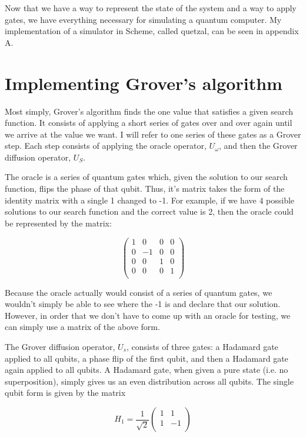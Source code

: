 \documentclass[11pt]{article}
\begin{document}
Now that we have a way to represent the state of the system and a way to apply gates, we have everything necessary for simulating a quantum computer. My implementation of a simulator in Scheme, called quetzal, can be seen in appendix A.

\section{Implementing Grover's algorithm}

Most simply, Grover's algorithm finds the one value that satisfies a given search function. It consists of applying a short series of gates over and over again until we arrive at the value we want. I will refer to one series of these gates as a Grover step. Each step consists of applying the oracle operator, $U_{\omega}$, and then the Grover diffusion operator, $U_{S}$.

The oracle is a series of quantum gates which, given the solution to our search function, flips the phase of that qubit. Thus, it's matrix takes the form of the identity matrix with a single 1 changed to -1. For example, if we have $4$ possible solutions to our search function and the correct value is 2, then the oracle could be represented by the matrix:

$$\begin{pmatrix}
1 & 0 & 0 & 0 \\
0 & -1 & 0 & 0 \\
0 & 0 & 1 & 0 \\
0 & 0 & 0 & 1 \\
\end{pmatrix}$$

Because the oracle actually would consist of a series of quantum gates, we wouldn't simply be able to see where the -1 is and declare that our solution. However, in order that we don't have to come up with an oracle for testing, we can simply use a matrix of the above form.

The Grover diffusion operator, $U_{s}$, consists of three gates: a Hadamard gate applied to all qubits, a phase flip of the first qubit, and then a Hadamard gate again applied to all qubits. A Hadamard gate, when given a pure state (i.e. no superposition), simply gives us an even distribution across all qubits. The single qubit form is given by the matrix

$$H_{1}=\frac{1}{\sqrt{2}} \begin{pmatrix}
1 & 1 \\
1 & -1 \\
\end{pmatrix}$$
\end{document}
